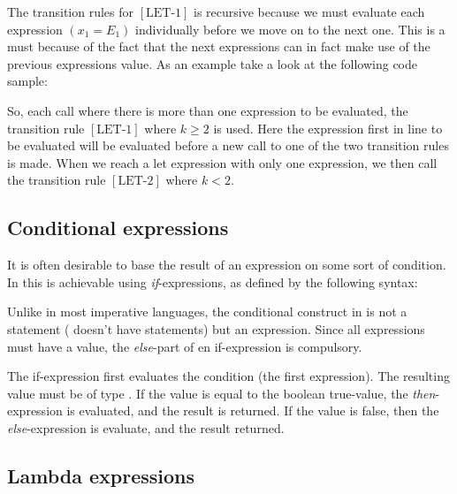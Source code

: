 

The transition rules for $[\mbox{LET-1}]$ is recursive because we must
evaluate each expression $(x_{1}=E_{1})$ individually before we move on to the next one. This
is a must because of the fact that the next expressions can in fact make use of
the previous expressions value. As an example take a look at the following code
sample:


So, each call where there is more than one expression to be evaluated, 
the transition rule $[\mbox{LET-1}]$ where $k \geq 2$ is used. Here the expression first
in line to be evaluated will be evaluated before a new call to one of the two
transition rules is made. When we reach a let expression with only one
expression, we then call the transition rule $[\mbox{LET-2}]$ where $k < 2$.

\subsection{Conditional expressions}
\label{sec:conditionalexpressions}

It is often desirable to base the result of an expression on some sort of condition.
In \productname{} this is achievable using \emph{if}-expressions, as defined by the
following syntax:

\begin{ebnf}
\end{ebnf}

Unlike in most imperative languages, the conditional construct in \productname{}
is not a statement (\productname{} doesn't have statements) but an expression.
Since all expressions must have a value, the \emph{else}-part of en
if-expression is compulsory.

The if-expression first evaluates the condition (the first expression). The
resulting value must be of type . If the value is equal to the
boolean true-value, the \emph{then}-expression is evaluated, and the result is
returned. If the value is false, then the \emph{else}-expression is evaluate,
and the result returned.

\subsection{Lambda expressions}
\label{sec:lambdaexpressions}

